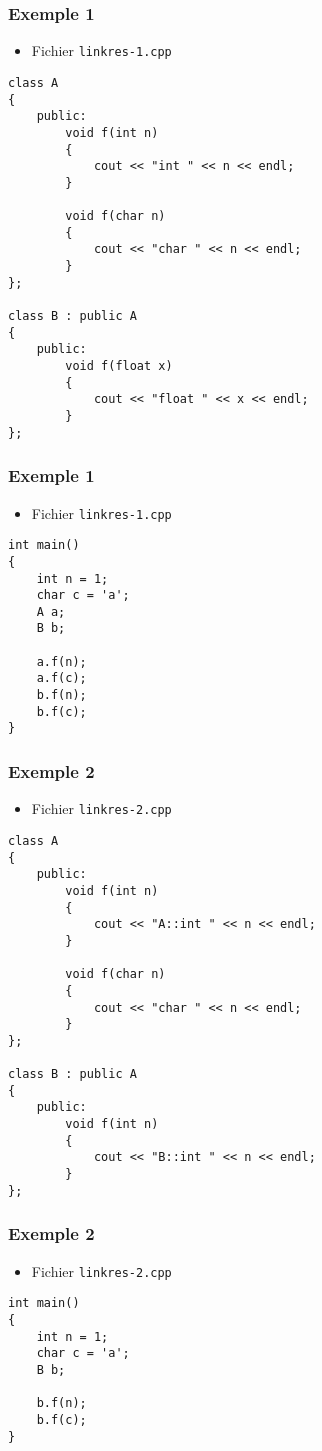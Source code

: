 \begin{frame}[containsverbatim]
\frametitle{Exemple 1}
\begin{itemize}
\item Fichier \texttt{linkres-1.cpp}
\end{itemize}
\begin{lstlisting}
class A
{
	public:
		void f(int n)
		{
			cout << "int " << n << endl;
		}

		void f(char n)
		{
			cout << "char " << n << endl;
		}
};

class B : public A
{
	public:
		void f(float x)
		{
			cout << "float " << x << endl;
		}
};
\end{lstlisting}
\end{frame}

\begin{frame}[containsverbatim]
\frametitle{Exemple 1}
\begin{itemize}
\item Fichier \texttt{linkres-1.cpp}
\end{itemize}
\begin{lstlisting}
int main()
{
	int n = 1;
	char c = 'a';
	A a;
	B b;
	
	a.f(n);
	a.f(c);
	b.f(n);
	b.f(c);
}
\end{lstlisting}
\end{frame}

\begin{frame}[containsverbatim]
\frametitle{Exemple 2}
\begin{itemize}
\item Fichier \texttt{linkres-2.cpp}
\end{itemize}
\begin{lstlisting}
class A
{
	public:
		void f(int n)
		{
			cout << "A::int " << n << endl;
		}

		void f(char n)
		{
			cout << "char " << n << endl;
		}
};

class B : public A
{
	public:
		void f(int n)
		{
			cout << "B::int " << n << endl;
		}
};
\end{lstlisting}
\end{frame}

\begin{frame}[containsverbatim]
\frametitle{Exemple 2}
\begin{itemize}
\item Fichier \texttt{linkres-2.cpp}
\end{itemize}
\begin{lstlisting}
int main()
{
	int n = 1;
	char c = 'a';
	B b;
	
	b.f(n);
	b.f(c);
}
\end{lstlisting}
\end{frame}

